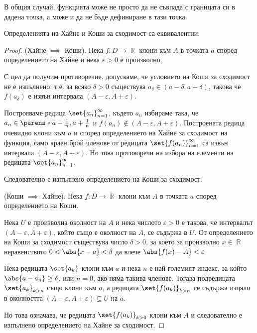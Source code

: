 \documentclass{../../common/topic}
\begin{document}
\begin{remark}
  В общия случай, функцията може не просто да не съвпада с границата си в дадена точка, а може и да не бъде дефиниране в тази точка.
\end{remark}

\begin{theorem}\label{thm:heine_iff_cauchy}
  Определенията на Хайне и Коши за сходимост са еквивалентни.
\end{theorem}
\begin{proof}
  (Хайне \( \implies \) Коши). Нека \( f: D \to \BbbR \) клони към \( A \) в точката \( a \) според определението на Хайне и нека \( \varepsilon > 0 \) е произволно.

  С цел да получим противоречие, допускаме, че условието на Коши за сходимост не е изпълнено, т.е. за всяко \( \delta > 0 \) съществува \( a_\delta \in (a - \delta, a + \delta) \), такова че \( f(a_\delta) \) е извън интервала \( (A - \varepsilon, A + \varepsilon) \).

  Построяваме редица \( \set{ a_n }_{n=1}^\infty \), където \( a_n \) избираме така, че \( a_n \in \parens*{a - \frac 1 n, a + \frac 1 n } \) и \( f(a_n) \not\in (A - \varepsilon, A + \varepsilon) \). Построената редица очевидно клони към \( a \) и според определението на Хайне за сходимост на функция, само краен брой членове от редицата \( \set{ f(a_n) }_{n=1}^\infty \) са извън интервала \( (A - \varepsilon, A + \varepsilon) \). Но това противоречи на избора на елементи на редицата \( \set{ a_n }_{n=1}^\infty \).

  Следователно е изпълнено определението на Коши за сходимост.

  (Коши \( \implies \) Хайне). Нека \( f: D \to \BbbR \) клони към \( A \) в точката \( a \) според определението на Коши.

  Нека \( U \) е произволна околност на \( A \) и нека числото \( \varepsilon > 0 \) е такова, че интервалът \( (A - \varepsilon, A + \varepsilon) \), който също е околност на \( A \), се съдържа в \( U \). От определението на Коши за сходимост съществува число \( \delta > 0 \), за което за произволно \( x \in \BbbR \) неравенството \( 0 < \abs{x - a} < \delta \) да влече \( \abs{f(x) - A} < \varepsilon \).

  Нека редицата \( \set{ a_k } \) клони към \( a \) и нека \( n \) е най-големият индекс, за който \( \abs{a - a_n} \geq \delta \), или \( n = 0 \), ако няма такива членове. Тогава подредицата \( {\set{ a_k }}_{k>n} \) също клони към \( a \), а редицата \( {\set{ f(a_k) }}_{k>n} \) се съдържа изцяло в околността \( (A - \varepsilon, A + \varepsilon) \subseteq U \) на \( a \).

  Но това означава, че редицата \( {\set{ f(a_k) }}_{k>0} \) клони към \( A \) и следователно е изпълнено определението на Хайне за сходимост.
\end{proof}
\end{document}
